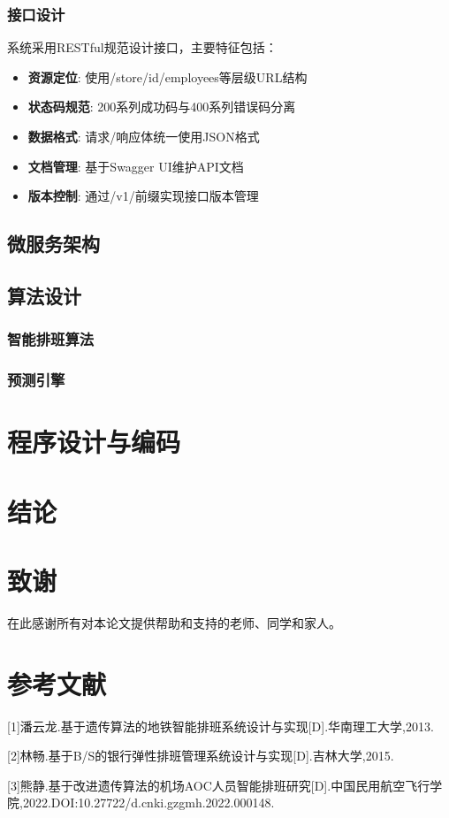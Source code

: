 \documentclass{ctexart}
\begin{document}
\subsubsection{接口设计}
系统采用RESTful规范设计接口，主要特征包括：
\begin{itemize}
    \item \textbf{资源定位}: 使用/store/{id}/employees等层级URL结构
    \item \textbf{状态码规范}: 200系列成功码与400系列错误码分离
    \item \textbf{数据格式}: 请求/响应体统一使用JSON格式
    \item \textbf{文档管理}: 基于Swagger UI维护API文档
    \item \textbf{版本控制}: 通过/v1/前缀实现接口版本管理
\end{itemize}
\subsection{微服务架构}
\subsection{算法设计}
\subsubsection{智能排班算法}
\subsubsection{预测引擎}

\section{程序设计与编码}

\section{结论}

\section*{致谢}
在此感谢所有对本论文提供帮助和支持的老师、同学和家人。

\section*{参考文献}
[1]潘云龙.基于遗传算法的地铁智能排班系统设计与实现[D].华南理工大学,2013.

[2]林畅.基于B/S的银行弹性排班管理系统设计与实现[D].吉林大学,2015.

[3]熊静.基于改进遗传算法的机场AOC人员智能排班研究[D].中国民用航空飞行学院,2022.DOI:10.27722/d.cnki.gzgmh.2022.000148.

\appendix
{}

\end{document}
